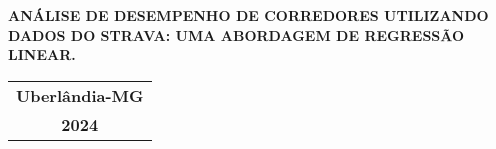 \documentclass[12pt,openright]{paper}
\begin{document}


\begin{titlepage}
    \bfseries\LARGE
    \centering
    \vspace*{3cm} %
    {ANÁLISE DE DESEMPENHO DE CORREDORES UTILIZANDO DADOS DO STRAVA: UMA ABORDAGEM DE REGRESSÃO LINEAR.}
    \vspace{2cm} %
    \vfill
    \begin{center}
    \begin{large}
    \begin{tabular}{c}
    \Large{\bfseries Uberlândia-MG}\\[0.25cm]
    \Large{\bfseries 2024}\\
    \end{tabular}
    \end{large}
    \end{center}
\end{titlepage}
\end{document}
